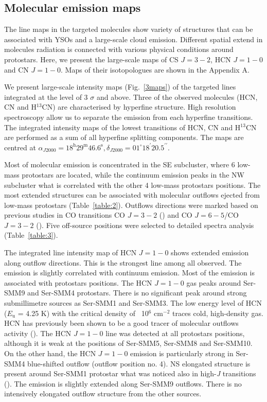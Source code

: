 \documentclass{aa}
\begin{document}
\subsection{Molecular emission maps}

The line maps in the targeted molecules show variety of structures that can be associated with YSOs and a large-scale cloud emission. Different spatial extend in molecules radiation is connected with various physical conditions around protostars. Here, we present the large-scale maps of CS $J=3-2$, HCN $J=1-0$ and CN $J=1-0$. Maps of their isotopologues are shown in the Appendix A. 

We present large-scale intensity maps (Fig.~\ref{3maps}) of the targeted lines integrated at the level of 3 $\sigma$ and above. Three of the observed molecules (HCN, CN and H$^{13}$CN) are characterised by hyperfine structure. High resolution spectroscopy allow us to separate the emission from each hyperfine transitions. The integrated intensity maps of the lowest transitions of HCN, CN and H$^{13}$CN are performed as a sum of all hyperfine splitting components. The maps are centred at $\alpha_{J2000} = 18^{\mathrm{h}} 29^{\mathrm{m}} 46.6^{\mathrm{s}}, \delta_{J2000} = 01^{\circ} 18^{\prime} 20.5 ^{\prime\prime}$.

Most of molecular emission is concentrated in the SE subcluster, where 6 low-mass protostars are located, while the continuum emission peaks in the NW subcluster  what is correlated with the other 4 low-mass protostars positions. The most extended structures can be associated with molecular outflows ejected from low-mass protostars (Table~\ref{table:2}). Outflows directions were marked based on previous studies in CO transitions CO $J=3-2$ (\cite{Dio10}) and CO $J=6-5$/CO $J=3-2$ (\cite{Yil15}). Five off-source positions were selected to detailed spectra analysis (Table~\ref{table:3}).  

The integrated line intensity map of HCN $J=1-0$ shows extended emission along outflow directions. This is the strongest line among all observed. The emission is slightly correlated with continuum emission. Most of the emission is associated with protostars positions. The HCN $J=1-0$ gas peaks around Ser-SMM9 and Ser-SMM4 protostars. There is no significant peak around strong submillimetre sources as Ser-SMM1 and Ser-SMM3. The low energy level of HCN ($E_\mathrm{u}$ = 4.25 K) with the critical density of ~10$^6$ cm$^{-2}$ traces cold, high-density gas. HCN has previously been shown to be a good tracer of molecular outflows activity (\cite{Lee14}). The HCN $J=1-0$ line was detected at all protostars positions, although it is weak at the positions of Ser-SMM5, Ser-SMM8 and Ser-SMM10. On the other hand, the HCN $J=1-0$ emission is particularly strong in Ser-SMM4 blue-shifted outflow (outflow position no. 4). NS elongated structure is present around Ser-SMM1 protostar what was noticed also in high-\textit{J} transitions (\cite{Yil15}). The emission is slightly extended along Ser-SMM9 outflows. There is no intensively elongated outflow structure from the other sources.
\end{document}
